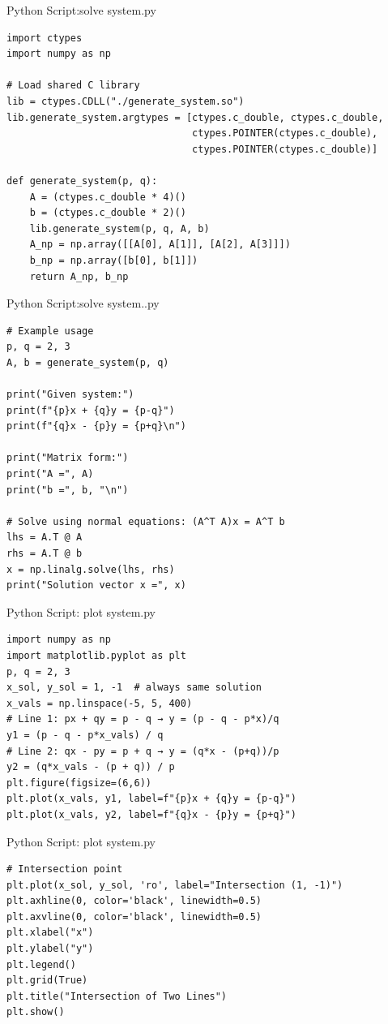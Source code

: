 \documentclass{beamer}
\numberwithin{equation}{section}
\theoremstyle{remark}
\begin{document}
\begin{frame}[fragile]{Python Script:solve system.py}
\begin{verbatim}
import ctypes
import numpy as np

# Load shared C library
lib = ctypes.CDLL("./generate_system.so")
lib.generate_system.argtypes = [ctypes.c_double, ctypes.c_double,
                                ctypes.POINTER(ctypes.c_double),
                                ctypes.POINTER(ctypes.c_double)]

def generate_system(p, q):
    A = (ctypes.c_double * 4)()
    b = (ctypes.c_double * 2)()
    lib.generate_system(p, q, A, b)
    A_np = np.array([[A[0], A[1]], [A[2], A[3]]])
    b_np = np.array([b[0], b[1]])
    return A_np, b_np
\end{verbatim}
\end{frame}

\begin{frame}[fragile]{Python Script:solve system..py}
\begin{verbatim}
# Example usage
p, q = 2, 3
A, b = generate_system(p, q)

print("Given system:")
print(f"{p}x + {q}y = {p-q}")
print(f"{q}x - {p}y = {p+q}\n")

print("Matrix form:")
print("A =", A)
print("b =", b, "\n")

# Solve using normal equations: (A^T A)x = A^T b
lhs = A.T @ A
rhs = A.T @ b
x = np.linalg.solve(lhs, rhs)
print("Solution vector x =", x)

\end{verbatim}
\end{frame}

\begin{frame}[fragile]{Python Script: plot system.py}
\begin{verbatim}
import numpy as np
import matplotlib.pyplot as plt
p, q = 2, 3
x_sol, y_sol = 1, -1  # always same solution
x_vals = np.linspace(-5, 5, 400)
# Line 1: px + qy = p - q → y = (p - q - p*x)/q
y1 = (p - q - p*x_vals) / q
# Line 2: qx - py = p + q → y = (q*x - (p+q))/p
y2 = (q*x_vals - (p + q)) / p
plt.figure(figsize=(6,6))
plt.plot(x_vals, y1, label=f"{p}x + {q}y = {p-q}")
plt.plot(x_vals, y2, label=f"{q}x - {p}y = {p+q}")
\end{verbatim}
\end{frame}
\begin{frame}[fragile]{Python Script: plot system.py}
\begin{verbatim}
# Intersection point
plt.plot(x_sol, y_sol, 'ro', label="Intersection (1, -1)")
plt.axhline(0, color='black', linewidth=0.5)
plt.axvline(0, color='black', linewidth=0.5)
plt.xlabel("x")
plt.ylabel("y")
plt.legend()
plt.grid(True)
plt.title("Intersection of Two Lines")
plt.show()
\end{verbatim}
\end{frame}
\end{document}
